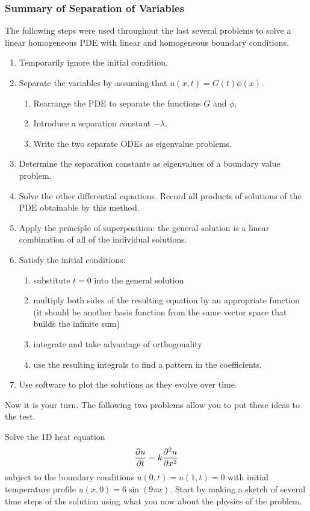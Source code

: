\subsubsection{Summary of Separation of Variables}
The following steps were used throughout the last several problems to solve a linear
homogeneous PDE with linear and homogeneous boundary conditions.
\begin{enumerate}
    \item Temporarily ignore the initial condition.
    \item Separate the variables by assuming that $u(x,t) = G(t) \phi(x)$.
        \begin{enumerate}
            \item Rearrange the PDE to separate the functions $G$ and $\phi$.
            \item Introduce a separation constant $-\lambda$.
            \item Write the two separate ODEs as eigenvalue problems.
        \end{enumerate}
    \item Determine the separation constants as eigenvalues of a boundary value problem.
    \item Solve the other differential equations.  Record all products of solutions of the
        PDE obtainable by this method.
    \item Apply the principle of superposition: the general solution is a linear
        combination of all of the individual solutions.
    \item Satisfy the initial conditions:
        \begin{enumerate}
            \item substitute $t=0$ into the general solution
            \item multiply both sides of the resulting equation by an appropriate function
                (it should be another basis function from the same vector space that
                builds the infinite sum)
            \item integrate and take advantage of orthogonality
            \item use the resulting integrals to find a pattern in the coefficients.
        \end{enumerate}
    \item Use software to plot the solutions as they evolve over time.
\end{enumerate}

Now it is your turn.  The following two problems allow you to put these ideas to the test.
\begin{problem}
    Solve the 1D heat equation 
    \[ \frac{\partial u}{\partial t} = k \frac{\partial^2 u}{\partial x^2} \]
    subject to the boundary conditions $u(0,t) = u(1,t) = 0$ with initial temperature
    profile $u(x,0) = 6\sin(9 \pi x)$.  Start by making a sketch of several time steps of
    the solution using what you now about the physics of the problem.
\end{problem}

